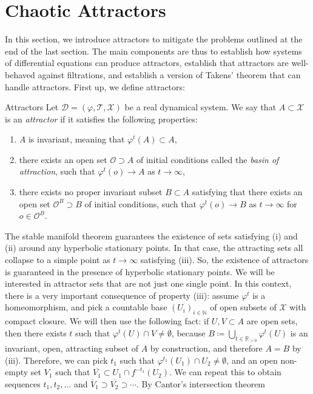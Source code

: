 \documentclass[11pt, a4paper]{memoir}
\theoremstyle{break}
\theoremstyle{break}
\theoremstyle{nonumberplain}
\newcommand{\mN}{\mathbb{N}}
\newcommand{\mR}{\mathbb{R}}
\begin{document}
\section{Chaotic Attractors}
In this section, we introduce attractors to mitigate the problems outlined at the end of the last section. The main components are thus to establish how systems of differential equations can produce attractors, establish that attractors are well-behaved against filtrations, and establish a version of Takens' theorem that can handle attractors. First up, we define attractors:
\begin{mydefinition}{Attractors}
Let $\mathcal{D}=(\varphi,\mathcal{T},\mathcal{X})$ be a real dynamical system. We say that $A\subset \mathcal{X}$ is an \emph{attractor} if it satisfies the following properties:
\begin{enumerate}[label=(\roman*)]
	\item $A$ is invariant, meaning that $\varphi^t(A)\subset A$,
	\item there exists an open set $\mathcal{O}\supset A$ of initial conditions called the \emph{basin of attraction}, such that $\varphi^t(o)\to A$ as $t\to \infty$,
	\item there exists no proper invariant subset $B\subset A$ satisfying that there exists an open set $\mathcal{O}^B\supset B$ of initial conditions, such that $\varphi^t(o)\to B$ as $t\to \infty$ for $o\in \mathcal{O}^B$.
\end{enumerate}
\end{mydefinition}
The stable manifold theorem guarantees the existence of sets satisfying (i) and (ii) around any hyperbolic stationary points. In that case, the attracting sets all collapse to a simple point as $t\to\infty$ satisfying (iii). So, the existence of attractors is guaranteed in the presence of hyperbolic stationary points. We will be interested in attractor sets that are not just one single point. In this context, there is a very important consequence of property (iii): assume $\varphi^t$ is a homeomorphism, and pick a countable base $(U_i)_{i\in \mN}$ of open subsets of $\mathcal{X}$ with compact closure. We will then use the following fact: if $U,V\subset A$ are open sets, then there exists $t$ such that $\varphi^{t}(U)\cap V\neq \emptyset$, because $B\coloneqq \bigcup_{t\in \mR_{>0}}\varphi^{t}(U)$ is an invariant, open, attracting subset of $A$ by construction, and therefore $A=B$ by (iii). Therefore, we can pick $t_1$ such that $\varphi^{t_1}(U_1)\cap U_2\neq\emptyset$, and an open non-empty set $V_1$ such that $\overline{V_1}\subset U_1\cap f^{-t_1}(U_2)$. We can repeat this to obtain sequences $t_1,t_2,\ldots$ and $\overline{V}_1\supset \overline{V_2}\supset\cdots$. By Cantor's intersection theorem
\end{document}
